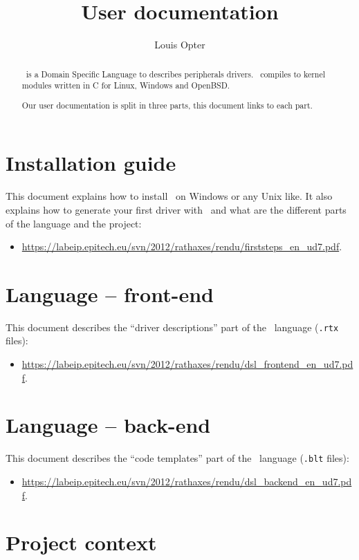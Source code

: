 \documentclass[american]{rtxarticle}
\title{User documentation}
\author{Louis Opter}
\begin{document}
\maketitle

\begin{abstract}
\rtx\ is a Domain Specific Language to describes peripherals drivers. \rtx\
compiles to kernel modules written in C for Linux, Windows and OpenBSD.

Our user documentation is split in three parts, this document links
to each part.
\end{abstract}

\section{Installation guide}

This document explains how to install \rtx\ on Windows or any Unix like. It
also explains how to generate your first driver with \rtx\ and what are the
different parts of the language and the project:
\begin{itemize}
\item {\small\url{https://labeip.epitech.eu/svn/2012/rathaxes/rendu/firststeps_en_ud7.pdf}}.
\end{itemize}

\section{Language -- front-end}

This document describes the ``driver descriptions'' part of the \rtx\ language
(\texttt{.rtx} files):
\begin{itemize}
\item {\small\url{https://labeip.epitech.eu/svn/2012/rathaxes/rendu/dsl_frontend_en_ud7.pdf}}.
\end{itemize}

\section{Language -- back-end}

This document describes the ``code templates'' part of the \rtx\ language
(\texttt{.blt} files):
\begin{itemize}
\item {\small\url{https://labeip.epitech.eu/svn/2012/rathaxes/rendu/dsl_backend_en_ud7.pdf}}.
\end{itemize}

\section*{Project context}
\end{document}
